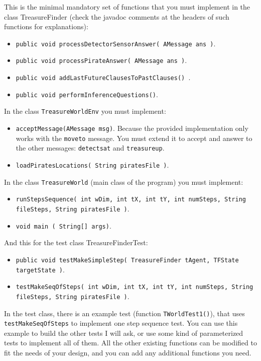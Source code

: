 \documentclass{tufte-handout}
\begin{document}
\begin{fullwidth}
This is the minimal mandatory set of functions that you must implement in the class TreasureFinder
(check the javadoc comments at the headers of such functions for explanations):
\begin{itemize}
\item {\tt public void processDetectorSensorAnswer( AMessage ans )}.
\item {\tt public void processPirateAnswer( AMessage ans )}.
\item {\tt  public void addLastFutureClausesToPastClauses() }.
\item {\tt public void  performInferenceQuestions()}.
\end{itemize}
In the class {\tt TreasureWorldEnv} you must implement:
\begin{itemize}
\item {\tt acceptMessage(AMessage msg)}. Because the provided implementation only works with
the {\tt moveto} message. You must extend it to accept and answer to the other messages:
{\tt detectsat} and {\tt treasureup}.
\item {\tt loadPiratesLocations( String piratesFile )}.
\end{itemize}
In the class {\tt TreasureWorld} (main class of the program) you must implement:
\begin{itemize}
\item {\tt runStepsSequence( int wDim, int tX, int tY,
                              int numSteps, String fileSteps, String piratesFile )}.
\item {\tt void main ( String[] args)}.
\end{itemize}
And this for the test class TreasureFinderTest:
\begin{itemize}
\item {\tt public void testMakeSimpleStep(  TreasureFinder tAgent,
                                          TFState targetState )}.
\item {\tt  testMakeSeqOfSteps( int wDim, int tX, int tY,
                                 int numSteps, String fileSteps, String piratesFile )}.
\end{itemize}

In the test class, there is an example test (function {\tt  TWorldTest1()}), that uses
{\tt testMakeSeqOfSteps} to implement one step sequence test. You can use this example to build
the other tests I will ask, or use some kind of parameterized tests to implement all of them.
All the other existing functions can be modified to fit the needs of your design,
and you can add any  additional functions you need.
\end{fullwidth}
\end{document}
